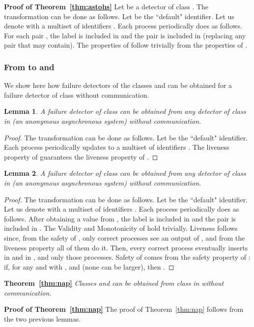 \documentclass[10pt, conference, compsocconf]{IEEEtran}
\newtheorem{lemma}{Lemma}
\newcommand{\tightparagraph}[1]{\smallskip \noindent \textbf{#1} \hspace{1ex}}
\begin{document}
\tightparagraph{Proof of Theorem~\ref{thm:astohs}}
Let  be a detector of class .
The transformation can be done as follows. Let  be the ``default" identifier. Let us denote with  a multiset of  identifiers . Each process  periodically does as follows. For each pair , the label  is included in  and the pair  is included in  (replacing any pair  that  may contain). The properties of  follow trivially from the properties of .

   
\subsubsection{From  to  and }

We show here how failure detectors of the classes  and  can be obtained for a failure detector of class  without communication.

\begin{lemma}
A failure detector of class  can be obtained from any detector  of class  in  (an anonymous asynchronous system) without communication.
\end{lemma}
\begin{proof}
The transformation can be done as follows. Let  be the ``default" identifier. Each process  
periodically updates  to a multiset of  identifiers . The liveness property of  guarantees the liveness property of .
\end{proof}

\begin{lemma}
A failure detector of class  can be obtained from any detector  of class  in  (an anonymous asynchronous system) without communication.
\end{lemma}
\begin{proof}
The transformation can be done as follows. Let  be the ``default" identifier. Let us denote with  a multiset of  identifiers . 
Each process  periodically does as follows. After obtaining a value  from , the label  is included in  and the pair  is included in . The Validity and Monotonicity of  hold trivially. Liveness follows since, from the safety of , only correct processes see an output of , and from the liveness property all of them do it. Then, every correct process  eventually inserts  in  and  in , and only those processes. Safety of  comes from the safety property of : if, for any  and  with ,  and  (none can be larger), then .
\end{proof}

\tightparagraph{Theorem~\ref{thm:nap}}
\emph{Classes  and  can be obtained from class  in  without communication.}

\tightparagraph{Proof of Theorem~\ref{thm:nap}}
The proof of Theorem~\ref{thm:nap} follows from the two previous lemmas.

 
\end{document}
